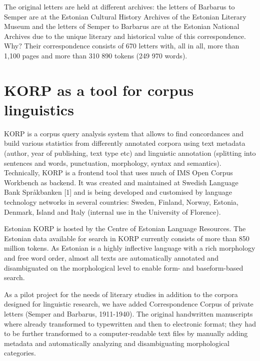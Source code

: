 \documentclass[runningheads]{llncs}
\begin{document}
The original letters are held at different archives: the letters of Barbarus to Semper are at the Estonian Cultural History Archives of the Estonian Literary Museum and the letters of Semper to Barbarus are at the Estonian National Archives due to the unique literary and historical value of this correspondence. Why? Their correspondence consists of 670 letters with, all in all, more than 1,100 pages and more than 310 890 tokens (249 970 words). 


\section{KORP as a tool for corpus linguistics}

KORP is a corpus query analysis system that allows to find concordances and build various statistics from differently annotated corpora using text metadata (author, year of publishing, text type etc) and linguistic annotation (splitting into sentences and words, punctuation, morphology, syntax and semantics). Technically, KORP is a frontend tool that uses much of IMS Open Corpus Workbench as backend. It was created and maintained at Swedish Language Bank Språkbanken [1] and is being developed and customised by language technology networks in several countries: Sweden, Finland, Norway, Estonia, Denmark, Island and Italy (internal use in the University of Florence).  

Estonian KORP is hosted by the Centre of Estonian Language Resources. The Estonian data available for search in KORP currently consists of more than 850 million tokens. As Estonian is a highly inflective language with a rich morphology and free word order, almost all texts are automatically annotated and disambiguated on the morphological level to enable form- and baseform-based search.


As a pilot project for the needs of literary studies in addition to the corpora designed for linguistic research, we have added Correspondence Corpus of private letters (Semper and Barbarus, 1911-1940). The original handwritten manuscripts where already transformed to typewritten and then to electronic format; they had to be further transformed to a computer-readable text files by manually adding metadata and automatically analyzing and disambiguating morphological categories. 
\end{document}
